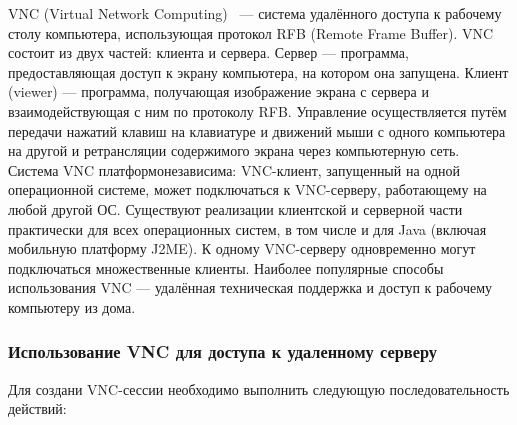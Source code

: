 VNC (\abbr Virtual Network Computing)~\cite{vnc} --- система удалённого доступа к рабочему столу компьютера, использующая протокол RFB (\abbr Remote Frame Buffer). VNC состоит из двух частей: клиента и сервера. Сервер — программа, предоставляющая доступ к экрану компьютера, на котором она запущена. Клиент (\abbr viewer) --- программа, получающая изображение экрана с сервера и взаимодействующая с ним по протоколу RFB. Управление осуществляется путём передачи нажатий клавиш на клавиатуре и движений мыши с одного компьютера на другой и ретрансляции содержимого экрана через компьютерную сеть. Система VNC платформонезависима: VNC-клиент, запущенный на одной операционной системе, может подключаться к VNC-серверу, работающему на любой другой ОС. Существуют реализации клиентской и серверной части практически для всех операционных систем, в том числе и для Java (включая мобильную платформу J2ME). К одному VNC-серверу одновременно могут подключаться множественные клиенты. Наиболее популярные способы использования VNC — удалённая техническая поддержка и доступ к рабочему компьютеру из дома.

\subsubsection{Использование VNC для доступа к удаленному серверу}

Для создани VNC-сессии необходимо выполнить следующую последовательность действий:

